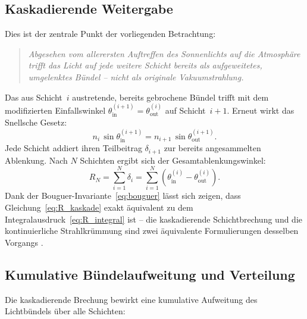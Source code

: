 \documentclass[12pt,a4paper]{article}
\begin{document}
\subsection{Kaskadierende Weitergabe}

Dies ist der zentrale Punkt der vorliegenden Betrachtung:
\begin{quote}
  \itshape
  Abgesehen vom allerersten Auftreffen des Sonnenlichts auf die
  Atmosphäre trifft das Licht auf jede weitere Schicht bereits
  als aufgeweitetes, umgelenktes Bündel -- nicht als originale
  Vakuumstrahlung.
\end{quote}

Das aus Schicht~$i$ austretende, bereits gebrochene Bündel trifft
mit dem modifizierten Einfallswinkel
$\theta_{\mathrm{in}}^{(i+1)} = \theta_{\mathrm{out}}^{(i)}$
auf Schicht~$i+1$.
Erneut wirkt das Snellsche Gesetz:
\begin{equation}
  n_i\,\sin\theta_{\mathrm{in}}^{(i+1)}
  = n_{i+1}\,\sin\theta_{\mathrm{out}}^{(i+1)}.
  \label{eq:snell_kaskade}
\end{equation}
Jede Schicht addiert ihren Teilbeitrag $\delta_{i+1}$ zur bereits
angesammelten Ablenkung.
Nach $N$ Schichten ergibt sich der Gesamtablenkungswinkel:
\begin{equation}
  R_N = \sum_{i=1}^{N} \delta_i
      = \sum_{i=1}^{N}
        \left(\theta_{\mathrm{in}}^{(i)} - \theta_{\mathrm{out}}^{(i)}\right).
  \label{eq:R_kaskade}
\end{equation}
Dank der Bouguer-Invariante~\eqref{eq:bouguer} lässt sich zeigen,
dass Gleichung~\eqref{eq:R_kaskade} exakt äquivalent zu dem
Integralausdruck~\eqref{eq:R_integral} ist --
die kaskadierende Schichtbrechung und die kontinuierliche
Strahlkrümmung sind zwei äquivalente Formulierungen desselben Vorgangs
\citep{BornWolf1999}.

\subsection{Kumulative Bündelaufweitung und Verteilung}

Die kaskadierende Brechung bewirkt eine kumulative Aufweitung des
Lichtbündels über alle Schichten:
\end{document}
